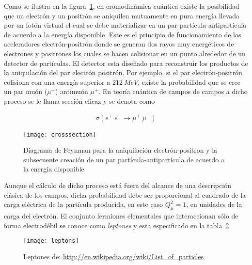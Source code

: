 Como se ilustra en la figura~\ref{fig:crosssection}, en cromodinámica cuántica existe la posibilidad que un electrón y un positrón se aniquilen mutuamente en pura energía llevada por un fotón virtual el cual se debe materializar en un par partícula-antipartícula de acuerdo a la energía disponible. Este es el principio de funcionamiento de los aceleradores electrón-positrón donde se generan dos rayos muy energéticos de electrones y positrones los cuales se hacen colisionar en un punto alrededor de un detector de partículas. El detector esta diseñado para reconstruir los productos de la aniquilación del par electrón positrón. Por ejemplo, si el par electrón-positrón colisiona con una energía superior a $\SI{212}{MeV}$, existe la probabilidad que se cree un par muón ($\mu^-$) antimuón $\mu^{+}$. En teoría cuántica de campos de campos a dicho proceso se le llama sección eficaz y se denota como
\begin{frame}
\begin{align}
  \sigma(e^+\;e^-\rightarrow \mu^+\;\mu^-)
\end{align}

\begin{figure}
  \centering
  \texttt{[image: crosssection]}
  \caption{Diagrama de Feynman para la aniquilación electrón-positron y la subsecuente creación de un par partícula-antipartícula de acuerdo a la energía disponible}
  \label{fig:crosssection}
\end{figure}
\end{frame}
Aunque el cálculo de dicho proceso está fuera del alcance de una descripción clásica de los campos, dicha probabilidad debe ser proporcional al cuadrado de la carga eléctrica de la partícula producida, en este caso $Q_{\mu}^2=1$, en unidades de la carga del electrón. El conjunto fermiones elementales que interaccionan sólo de forma electrodébil se conoce como \emph{leptones} y esta especificado en la tabla~\ref{tab:leptons}
\begin{frame}
\begin{figure}
  \centering
  \texttt{[image: leptons]}
  \caption{Leptones de: \url{http://en.wikipedia.org/wiki/List_of_particles}}
  \label{tab:leptons}
\end{figure}
\end{frame}

